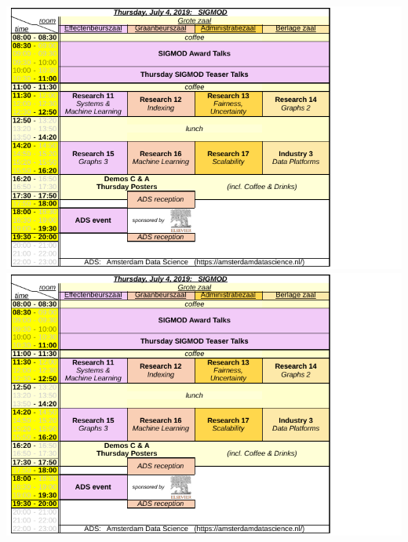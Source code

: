 \ifodd\value{page}
\includegraphics[angle=90,width=\textwidth]{schedule/p5.pdf}%
\else
\includegraphics[angle=270,width=\textwidth]{schedule/p5.pdf}%
\fi

\newpage

